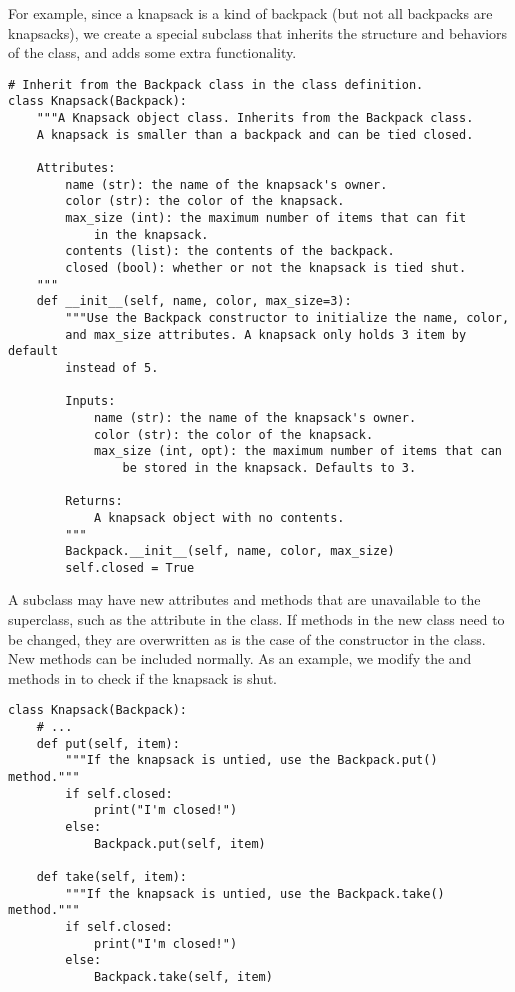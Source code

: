 For example, since a knapsack is a kind of backpack (but not all backpacks are knapsacks), we create a special  subclass that inherits the structure and behaviors of the  class, and adds some extra functionality.

\begin{lstlisting}
# Inherit from the Backpack class in the class definition.
class Knapsack(Backpack):
    """A Knapsack object class. Inherits from the Backpack class.
    A knapsack is smaller than a backpack and can be tied closed.
    
    Attributes:
        name (str): the name of the knapsack's owner.
        color (str): the color of the knapsack.
        max_size (int): the maximum number of items that can fit
            in the knapsack.
        contents (list): the contents of the backpack.
        closed (bool): whether or not the knapsack is tied shut.
    """
    def __init__(self, name, color, max_size=3):
        """Use the Backpack constructor to initialize the name, color,
        and max_size attributes. A knapsack only holds 3 item by default
        instead of 5.

        Inputs:
            name (str): the name of the knapsack's owner.
            color (str): the color of the knapsack.
            max_size (int, opt): the maximum number of items that can
                be stored in the knapsack. Defaults to 3.
        
        Returns:
            A knapsack object with no contents.
        """
        Backpack.__init__(self, name, color, max_size)
        self.closed = True
\end{lstlisting}

A subclass may have new attributes and methods that are unavailable to the superclass, such as the  attribute in the  class.
If methods in the new class need to be changed, they are overwritten as is the case of the constructor in the  class.
New methods can be included normally.
As an example, we modify the  and  methods in  to check if the knapsack is shut.

\begin{lstlisting}
class Knapsack(Backpack):
    # ...
    def put(self, item):
        """If the knapsack is untied, use the Backpack.put() method."""
        if self.closed:
            print("I'm closed!")
        else:
            Backpack.put(self, item)
    
    def take(self, item):
        """If the knapsack is untied, use the Backpack.take() method."""
        if self.closed:
            print("I'm closed!")
        else:
            Backpack.take(self, item)
\end{lstlisting}

